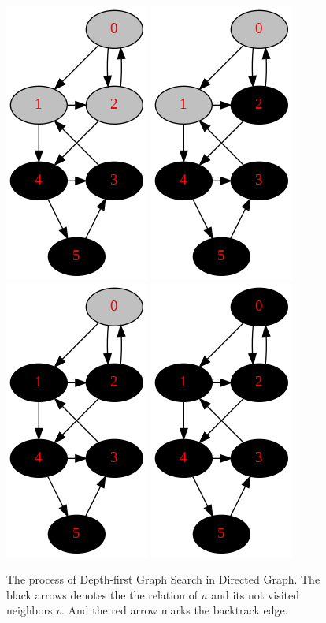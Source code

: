 \documentclass[../main.tex]{subfiles}
\begin{document}
\begin{figure}[!ht]
        \includegraphics[width=0.2\columnwidth]{fig/depth_first_graph_search_process8.png}
    \includegraphics[width=0.2\columnwidth]{fig/depth_first_graph_search_process9.png}
    \includegraphics[width=0.2\columnwidth]{fig/depth_first_graph_search_process10.png}
    \includegraphics[width=0.2\columnwidth]{fig/depth_first_graph_search_process11.png}
    \caption{The process of Depth-first Graph Search in Directed Graph. The black arrows denotes the the relation of $u$ and its not visited neighbors $v$. And the red arrow marks the backtrack edge. }
    \label{fig:depth_first_graph_search_process}
\end{figure}
\end{document}

